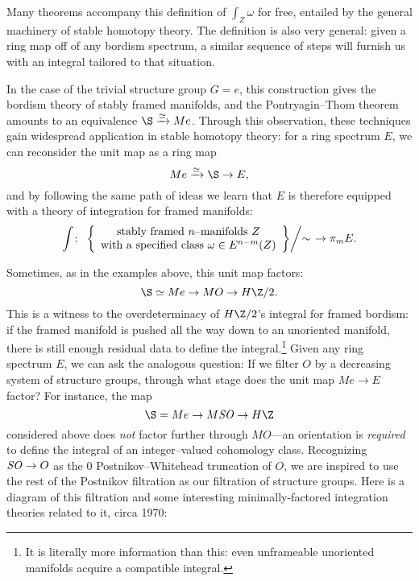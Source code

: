 \noindent Many theorems accompany this definition of \(\int_Z \omega\) for free, entailed by the general machinery of stable homotopy theory.  The definition is also very general: given a ring map off of any bordism spectrum, a similar sequence of steps will furnish us with an integral tailored to that situation.

In the case of the trivial structure group \(G = e\), this construction gives the bordism theory of stably framed manifolds, and the Pontryagin--Thom theorem amounts to an equivalence \(\S \xrightarrow{\simeq} Me\).  Through this observation, these techniques gain widespread application in stable homotopy theory: for a ring spectrum \(E\), we can reconsider the unit map as a ring map \[Me \xrightarrow{\simeq} \S \to E,\] and by following the same path of ideas we learn that \(E\) is therefore equipped with a theory of integration for framed manifolds: \[\int\colon\thinspace \left. \left\{ \begin{array}{c}\text{stably framed \(n\)--manifolds \(Z\)} \\ \text{with a specified class \(\omega \in E^{n-m}(Z)\)} \end{array}\right\} \middle/ \sim \right. \to \pi_m E.\]

Sometimes, as in the examples above, this unit map factors: \[\S \simeq Me \to MO \to H\Z/2.\]  This is a witness to the overdeterminacy of \(H\Z/2\)'s integral for framed bordism: if the framed manifold is pushed all the way down to an unoriented manifold, there is still enough residual data to define the integral.\footnote{It is literally more information than this: even unframeable unoriented manifolds acquire a compatible integral.}  Given any ring spectrum \(E\), we can ask the analogous question: If we filter \(O\) by a decreasing system of structure groups, through what stage does the unit map \(Me \to E\) factor?  For instance, the map \[\S = Me \to M\SO \to H\Z\] considered above does \emph{not} factor further through \(MO\)---an orientation is \emph{required} to define the integral of an integer--valued cohomology class.  Recognizing \(\mathit{SO} \to O\) as the \(0\){\th} Postnikov--Whitehead truncation of \(O\), we are inspired to use the rest of the Postnikov filtration as our filtration of structure groups.  Here is a diagram of this filtration and some interesting minimally-factored integration theories related to it, circa 1970:
\begin{center}
\end{center}

